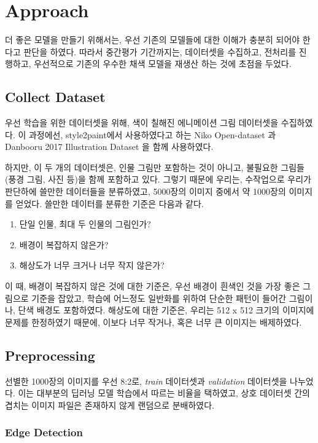 \section{Approach}

더 좋은 모델을 만들기 위해서는, 우선 기존의 모델들에 대한 이해가 충분히 되어야 한다고 판단을 하였다.
따라서 중간평가 기간까지는, 데이터셋을 수집하고, 전처리를 진행하고, 우선적으로 기존의 우수한  채색 모델을 재생산 하는 것에 초점을 두었다.

\subsection{Collect Dataset}

우선 학습을 위한 데이터셋을 위해, 색이 칠해진 에니메이션 그림 데이터셋을 수집하였다.
이 과정에선, style2paint에서 사용하였다고 하는 Niko Open-dataset \cite{ikuta2016}과 Danbooru 2017 Illustration Dataset \cite{danbooru2017}을 함께 사용하였다.

하지만, 이 두 개의 데이터셋은, 인물 그림만 포함하는 것이 아니고, 불필요한 그림들 (풍경 그림, 사진 등)을 함께 포함하고 있다.
그렇기 때문에 우리는, 수작업으로 우리가 판단하에 쓸만한 데이터들을 분류하였고, 5000장의 이미지 중에서 약 1000장의 이미지를 얻었다.
쓸만한 데이터를 분류한 기준은 다음과 같다.
\begin{enumerate}[topsep=0pt,itemsep=-1ex,partopsep=1ex,parsep=1ex]
	\item 단일 인물, 최대 두 인물의 그림인가?
	\item 배경이 복잡하지 않은가?
	\item 해상도가 너무 크거나 너무 작지 않은가?
\end{enumerate}
이 때, 배경이 복잡하지 않은 것에 대한 기준은, 우선 배경이 흰색인 것을 가장 좋은 그림으로 기준을 잡았고, 학습에 어느정도 일반화를 위하여 단순한 패턴이 들어간 그림이나, 단색 배경도 포함하였다. 해상도에 대한 기준은, 우리는 512 x 512 크기의 이미지에 문제를 한정하였기 때문에, 이보다 너무 작거나, 혹은 너무 큰 이미지는 배제하였다.

\subsection{Preprocessing}

선별한 1000장의 이미지를 우선 8:2로, \textit{train} 데이터셋과 \textit{validation} 데이터셋을 나누었다.
이는 대부분의 딥러닝 모델 학습에서 따르는 비율을 택하였고, 상호 데이터셋 간의 겹치는 이미지 파일은 존재하지 않게 랜덤으로 분배하였다.

\subsubsection{Edge Detection}

